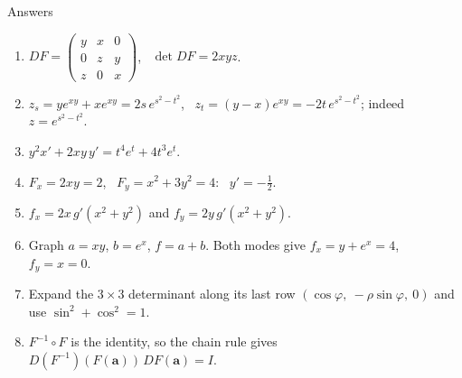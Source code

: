 \documentclass[10pt]{wosm-slides}
\newcommand{\va}{\mathbf{a}}
\begin{document}
\begin{frame}{Answers}
  \small
  \begin{enumerate}
    \item $DF = \begin{pmatrix} y & x & 0 \\ 0 & z & y \\ z & 0 & x \end{pmatrix}$, \ $\det DF = 2xyz$.
    \item $z_s = y e^{xy} + x e^{xy} = 2s\, e^{s^2 - t^2}$, \ $z_t = (y - x) e^{xy} = -2t\, e^{s^2 - t^2}$;
      indeed $z = e^{s^2 - t^2}$.
    \item $y^2 x' + 2xy\, y' = t^4 e^t + 4t^3 e^t$.
    \item $F_x = 2xy = 2$, \ $F_y = x^2 + 3y^2 = 4$: \ $y' = -\frac12$.
    \item $f_x = 2x\, g'(x^2 + y^2)$ and $f_y = 2y\, g'(x^2 + y^2)$.
    \item Graph $a = xy$, $b = e^x$, $f = a + b$. Both modes give $f_x = y + e^x = 4$, \ $f_y = x = 0$.
    \item Expand the $3 \times 3$ determinant along its last row
      $(\cos\varphi, \ -\rho\sin\varphi, \ 0)$ and use $\sin^2 + \cos^2 = 1$.
    \item $F^{-1} \circ F$ is the identity, so the chain rule gives $D(F^{-1})(F(\va))\, DF(\va) = I$.
  \end{enumerate}
\end{frame}

\end{document}
